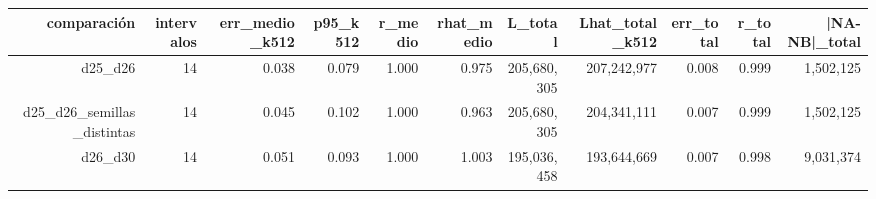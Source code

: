 \begin{tabular}{rrrrrrrrrrr}
\toprule
comparación & intervalos & err\_medio\_k512 & p95\_k512 & r\_medio & rhat\_medio & L\_total & Lhat\_total\_k512 & err\_total & r\_total & |NA-NB|\_total \\
\midrule
d25\_d26 & 14 & 0.038 & 0.079 & 1.000 & 0.975 & 205,680,305 & 207,242,977 & 0.008 & 0.999 & 1,502,125 \\
d25\_d26\_semillas\_distintas & 14 & 0.045 & 0.102 & 1.000 & 0.963 & 205,680,305 & 204,341,111 & 0.007 & 0.999 & 1,502,125 \\
d26\_d30 & 14 & 0.051 & 0.093 & 1.000 & 1.003 & 195,036,458 & 193,644,669 & 0.007 & 0.998 & 9,031,374 \\
\bottomrule
\end{tabular}
